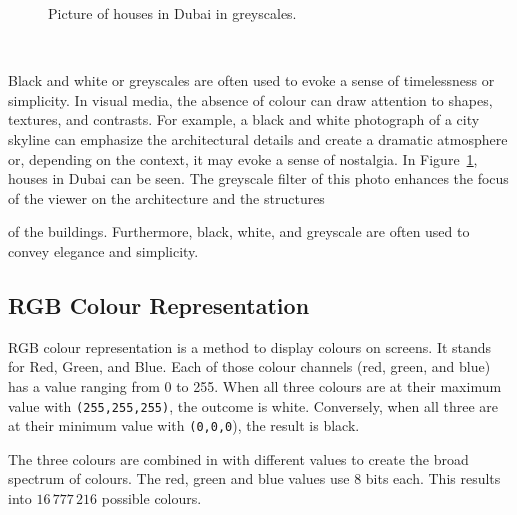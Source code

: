 \documentclass[../MasterThesis.tex]{subfiles}
\begin{document}
\begin{minipage}{0.5\textwidth}
	\begin{figure}[H]
	\begin{center}
		\caption[Picture of a houses in Dubai in greyscales.]{Picture of houses in Dubai in greyscales.}
		\label{figure:gray}
	\end{center}
\end{figure}\hfill
\end{minipage}\begin{minipage}{0.05\textwidth}
	\ 
\end{minipage}\begin{minipage}{0.45\textwidth}
	Black and white or greyscales are often used to evoke a sense of timelessness or simplicity. In visual media, the absence of colour can draw attention to shapes, textures, and contrasts. For example, a black and white photograph of a city skyline can emphasize the architectural details and create a dramatic atmosphere or, depending on the context, it may evoke a sense of nostalgia.
	In Figure~\ref{figure:gray}, houses in Dubai can be seen. The greyscale filter of this photo enhances the focus of the viewer on the architecture and the structures

	
\end{minipage}

\vspace*{-0.6em}
 of the buildings. Furthermore, black, white, and greyscale are often used to convey elegance and simplicity.~\cite{colour2}


%





\subsection{RGB Colour Representation}
\label{subsection:RGB}


RGB colour representation is a method to display colours on screens. It stands for Red, Green, and Blue. 
Each of those colour channels (red, green, and blue) has a value ranging from 0 to 255. When all three colours are at their maximum value with \texttt{(255,255,255)}, the outcome is white. Conversely, when all three are at their minimum value with \texttt{(0,0,0}), the result is black.~\cite{colourRGB}

The three colours are combined in with different values to create the broad spectrum of colours. The red, green and blue values use 8 bits each. This results into $16\, 777\, 216$ possible colours.
\end{document}
